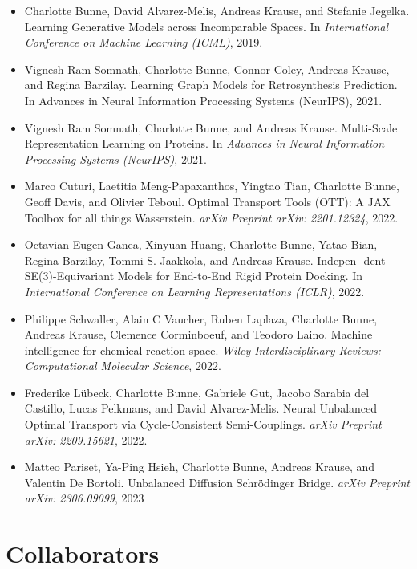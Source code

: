 \begin{itemize}
	\item[] Charlotte Bunne, David Alvarez-Melis, Andreas Krause, and Stefanie Jegelka. Learning Generative Models across Incomparable Spaces. In \textit{International Conference on Machine Learning (ICML)}, 2019.
	\item[] Vignesh Ram Somnath, Charlotte Bunne, Connor Coley, Andreas Krause, and Regina Barzilay. Learning Graph Models for Retrosynthesis Prediction. In Advances in Neural Information Processing Systems (NeurIPS), 2021.
	\item[] Vignesh Ram Somnath, Charlotte Bunne, and Andreas Krause. Multi-Scale Representation Learning on Proteins. In \textit{Advances in Neural Information Processing Systems (NeurIPS)}, 2021.
	\item[] Marco Cuturi, Laetitia Meng-Papaxanthos, Yingtao Tian, Charlotte Bunne, Geoff Davis, and Olivier Teboul. Optimal Transport Tools (OTT): A JAX Toolbox for all things Wasserstein. \textit{arXiv Preprint arXiv: 2201.12324}, 2022.
	\item[] Octavian-Eugen Ganea, Xinyuan Huang, Charlotte Bunne, Yatao Bian, Regina Barzilay, Tommi S. Jaakkola, and Andreas Krause. Indepen- dent SE(3)-Equivariant Models for End-to-End Rigid Protein Docking. In \textit{International Conference on Learning Representations (ICLR)}, 2022.
	\item[] Philippe Schwaller, Alain C Vaucher, Ruben Laplaza, Charlotte Bunne, Andreas Krause, Clemence Corminboeuf, and Teodoro Laino. Machine intelligence for chemical reaction space. \textit{Wiley Interdisciplinary Reviews: Computational Molecular Science}, 2022.
	\item[] Frederike L\"ubeck, Charlotte Bunne, Gabriele Gut, Jacobo Sarabia del Castillo, Lucas Pelkmans, and David Alvarez-Melis. Neural Unbalanced Optimal Transport via Cycle-Consistent Semi-Couplings. \textit{arXiv Preprint arXiv: 2209.15621}, 2022.
	\item[] Matteo Pariset, Ya-Ping Hsieh, Charlotte Bunne, Andreas Krause, and Valentin De Bortoli. Unbalanced Diffusion Schr{\"o}dinger Bridge. \textit{arXiv Preprint arXiv: 2306.09099}, 2023
\end{itemize}

\section{Collaborators}

